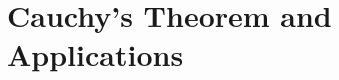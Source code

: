 \documentclass[../../main.tex]{subfiles}
\begin{document}
\chapter{Cauchy's Theorem and Applications}
\end{document}
